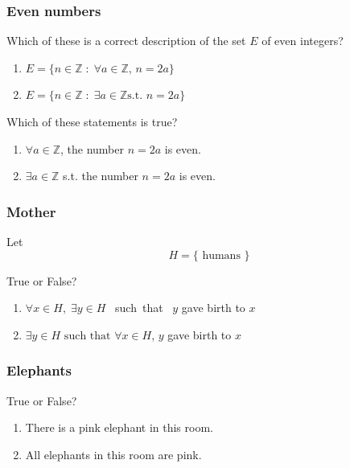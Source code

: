 \begin{frame}[t]
	\frametitle{Even numbers}

	Which of these is a correct description of the set $E$ of even integers?
	\begin{enumerate}
		\item $\displaystyle E = \{ n \in \mathbb{Z}\; : \; \forall a \in \mathbb{Z},
			\, n = 2a \}$

		\item $\displaystyle E = \{ n \in \mathbb{Z}\; : \; \exists a \in \mathbb{Z}\text{
			s.t. }n = 2a \}$
	\end{enumerate}

	\vfill

	Which of these statements is true?
	\begin{enumerate}
		\addtocounter{enumi}{2}

		\item $\displaystyle \forall a \in \mathbb{Z}$, the number
			$\displaystyle n=2a$ is even.

		\item $\displaystyle \exists a \in \mathbb{Z}$ s.t. the number
			$\displaystyle n=2a$ is even.
	\end{enumerate}

	\vfill
\end{frame}

\begin{frame}
	\frametitle{Mother}

	Let
	\[
		H = \{ \text{ humans }\}
	\]

	\vfill

	True or False?

	\begin{enumerate}
		\item $\displaystyle \forall x \in H, \; \exists y \in H$ \mbox{ such that }
			$y$ gave birth to $x$

		\item $\displaystyle \exists y \in H \text{ such that }\forall x \in H$, $y$
			gave birth to $x$
	\end{enumerate}

	\vfill
\end{frame}

\begin{frame}
	\frametitle{Elephants}

	True or False?

	\begin{enumerate}
		\item There is a pink elephant in this room.

		\item All elephants in this room are pink.
	\end{enumerate}
\end{frame}

